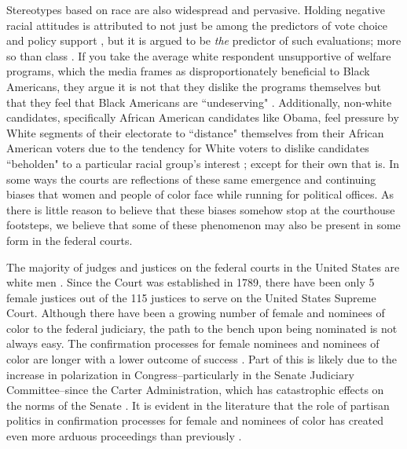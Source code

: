 \documentclass [12pt]{article}
\begin{document}
Stereotypes based on race are also widespread and pervasive. Holding negative racial attitudes is attributed to not just be among the predictors of vote choice and policy support \citep{sides_et-al_2020, gilens_1999}, but it is argued to be \textit{the} predictor of such evaluations; more so than class \citep{hajnal_2020}. If you take the average white respondent unsupportive of welfare programs, which the media frames as disproportionately beneficial to Black Americans, they argue it is not that they dislike the programs themselves but that they feel that Black Americans are ``undeserving" \citep{winter_2008}. Additionally, non-white candidates, specifically African American candidates like Obama, feel pressure by White segments of their electorate to ``distance" themselves from their African American voters due to the tendency for White voters to dislike candidates ``beholden" to a particular racial group's interest \citep{stephens_dougan_2020}; except for their own that is. In some ways the courts are reflections of these same emergence and continuing biases that women and people of color face while running for political offices. As there is little reason to believe that these biases somehow stop at the courthouse footsteps, we believe that some of these phenomenon may also be present in some form in the federal courts.

The majority of judges and justices on the federal courts in the United States are white men \citep{Kastellec2013}. Since the Court was established in 1789, there have been only 5 female justices out of the 115 justices to serve on the United States Supreme Court. Although there have been a growing number of female and nominees of color to the federal judiciary, the path to the bench upon being nominated is not always easy. The confirmation processes for female nominees and nominees of color are longer with a lower outcome of success \citep{Asmussen2011}. Part of this is likely due to the increase in polarization in Congress--particularly in the Senate Judiciary Committee--since the Carter Administration, which has catastrophic effects on the norms of the Senate \citep{Owens2018, McCarty}. It is evident in the literature that the role of partisan politics in confirmation processes for female and nominees of color has created even more arduous proceedings than previously \citep{Solowiej2005}. 
\end{document}
